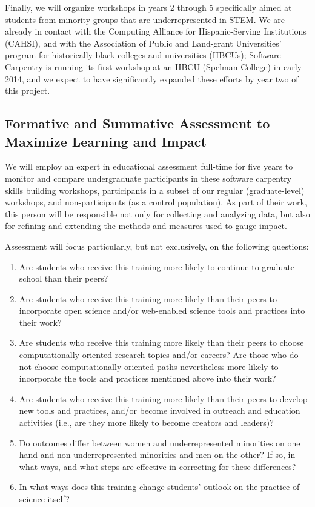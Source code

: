 \documentclass{proposalnsf}
\newlength{\up}
\begin{document}
Finally, we will organize workshops in years 2 through 5 specifically aimed
at students from minority groups that are underrepresented in STEM.
We are already in contact with the Computing Alliance for
Hispanic-Serving Institutions (CAHSI), and with the Association of
Public and Land-grant Universities' program for historically black
colleges and universities (HBCUs); Software Carpentry is running its
first workshop at an HBCU (Spelman College) in early 2014, and we expect to
have significantly expanded these efforts by year two of this project.

\subsection{Formative and Summative Assessment to Maximize Learning and Impact}

We will employ an expert in educational assessment full-time for five
years to monitor and compare undergraduate participants in these
software carpentry skills building workshops, participants in a subset
of our regular (graduate-level) workshops, and non-participants (as a
control population).  As part of their work, this person will be
responsible not only for collecting and analyzing data, but also for
refining and extending the methods and measures used to gauge impact.

Assessment will focus particularly, but not exclusively, on the
following questions:

\begin{enumerate}

\item
  Are students who receive this training more likely to continue to
  graduate school than their peers?

\item
  Are students who receive this training more likely than their peers
  to incorporate open science and/or web-enabled science tools and
  practices into their work?

\item
  Are students who receive this training more likely than their peers
  to choose computationally oriented research topics and/or careers?
  Are those who do not choose computationally oriented paths
  nevertheless more likely to incorporate the tools and practices
  mentioned above into their work?

\item
  Are students who receive this training more likely than their peers
  to develop new tools and practices, and/or become involved in
  outreach and education activities (i.e., are they more likely to
  become creators and leaders)?

\item
  Do outcomes differ between women and underrepresented minorities on
  one hand and non-underrepresented minorities and men on the other?
  If so, in what ways, and what steps are effective in correcting for
  these differences?

\item
  In what ways does this training change students' outlook on the
  practice of science itself?

\end{enumerate}
\end{document}
